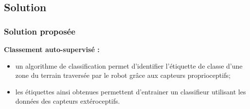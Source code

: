\subsection{Solution}
    \begin{frame}[allowframebreaks]
        \frametitle{Solution proposée}
        \textbf{Classement auto-supervisé :} \\  
        \begin{itemize}
            \item un algorithme de classification permet d'identifier l'étiquette de classe d'une zone du terrain traversée par le robot grâce aux capteurs proprioceptifs;
            \item les étiquettes ainsi obtenues permettent d'entrainer un classifieur utilisant les données des capteurs extéroceptifs.
        \end{itemize} 
    \end{frame}
    

